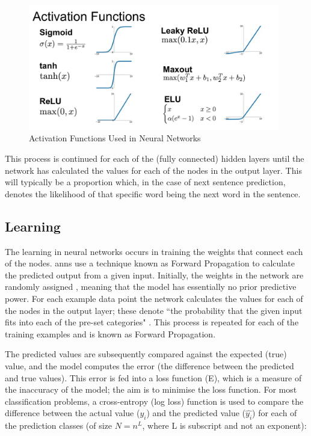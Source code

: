 \begin{figure}[h]
    \centering
    \includegraphics[height=5.5cm,trim={0 0 0 3.5cm},clip]{paper/images/activation_functions.png}
    \caption{Activation Functions Used in Neural Networks \citep{Udofia}}
    \label{fig:activation_functions}
\end{figure}

This process is continued for each of the (fully connected) hidden layers until the network has calculated the values for each of the nodes in the output layer. This will typically be a proportion which, in the case of next sentence prediction, denotes the likelihood of that specific word being the next word in the sentence.

\subsection{Learning}\label{sec:background_anns_learning}
The learning in neural networks occurs in training the weights that connect each of the nodes. \acrlong{ann}s use a technique known as Forward Propagation to calculate the predicted output from a given input. Initially, the weights in the network are randomly assigned \citep{Bishop}, meaning that the model has essentially no prior predictive power. For each example data point the network calculates the values for each of the nodes in the output layer; these denote ``the probability that the given input fits into each of the pre-set categories" \citep{Yathish}. This process is repeated for each of the training examples and is known as Forward Propagation. 

The predicted values are subsequently compared against the expected (true) value, and the model computes the error (the difference between the predicted and true values). This error is fed into a loss function (E), which is a measure of the inaccuracy of the model; the aim is to minimise the loss function. For most classification problems, a cross-entropy (log loss) function is used to compare the difference between the actual value ($y_i$) and the predicted value ($\hat{y_i}$) for each of the prediction classes (of size $N=n^L$, where L is subscript and not an exponent):

